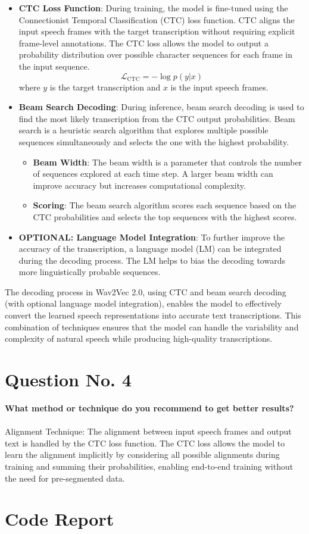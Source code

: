 \documentclass{article}
\begin{document}
\begin{itemize}

  \item \textbf{CTC Loss Function}: During training, the model is fine-tuned using the Connectionist Temporal Classification (CTC) loss function. CTC aligns the input speech frames with the target transcription without requiring explicit frame-level annotations. The CTC loss allows the model to output a probability distribution over possible character sequences for each frame in the input sequence.
  \[
  \mathcal{L}_{\text{CTC}} = -\log p(y | x)
  \]
  where \( y \) is the target transcription and \( x \) is the input speech frames.

  \item \textbf{Beam Search Decoding}: During inference, beam search decoding is used to find the most likely transcription from the CTC output probabilities. Beam search is a heuristic search algorithm that explores multiple possible sequences simultaneously and selects the one with the highest probability.
  \begin{itemize}
    \item \textbf{Beam Width}: The beam width is a parameter that controls the number of sequences explored at each time step. A larger beam width can improve accuracy but increases computational complexity.
    \item \textbf{Scoring}: The beam search algorithm scores each sequence based on the CTC probabilities and selects the top sequences with the highest scores.
  \end{itemize}

  \item \textbf{OPTIONAL: Language Model Integration}: To further improve the accuracy of the transcription, a language model (LM) can be integrated during the decoding process. The LM helps to bias the decoding towards more linguistically probable sequences.

\end{itemize}

The decoding process in Wav2Vec 2.0, using CTC and beam search decoding (with optional language model integration), enables the model to effectively convert the learned speech representations into accurate text transcriptions. This combination of techniques ensures that the model can handle the variability and complexity of natural speech while producing high-quality transcriptions.


\pagebreak

\section*{Question No. 4}
\textbf{What method or technique do you recommend to get better results?}\\\\
Alignment Technique: The alignment between input speech frames and output text is handled by the CTC loss function. The CTC loss allows the model to learn the alignment implicitly by considering all possible alignments during training and summing their probabilities, enabling end-to-end training without the need for pre-segmented data.

\pagebreak

\section*{Code Report}
\end{document}
